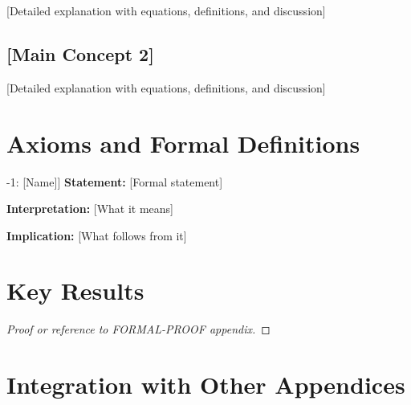 [Detailed explanation with equations, definitions, and discussion]

\subsection{[Main Concept 2]}

[Detailed explanation with equations, definitions, and discussion]


\section{Axioms and Formal Definitions}
\label{sec:[code]-axioms}


\begin{tcolorbox}[colback=gray!5!white, colframe=gray!75!black, 
    title=Axiom [CODE]-1: [Name]]
\textbf{Statement:} [Formal statement]

\textbf{Interpretation:} [What it means]

\textbf{Implication:} [What follows from it]
\end{tcolorbox}



\section{Key Results}
\label{sec:[code]-results}


\begin{proposition}
\end{proposition}

\begin{proof}
[Proof or reference to FORMAL-PROOF appendix]
\end{proof}


\section{Integration with Other Appendices}
\label{sec:[code]-integration}

